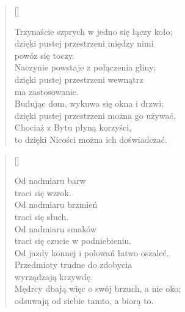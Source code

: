 \settowidth{\versewidth}{Trzynaście szprych w jedno się łączy koło;}
\begin{verse}[\versewidth]

  Trzynaście szprych w jedno się łączy koło; \\
  dzięki pustej przestrzeni między nimi \\
  powóz się toczy. \\
  Naczynie powstaje z połączenia gliny; \\
  dzięki pustej przestrzeni wewnątrz \\
  ma zastosowanie. \\
  Budując dom, wykuwa się okna i drzwi; \\
  dzięki pustej przestrzeni można go używać. \\
  Chociaż z Bytu płyną korzyści, \\
  to dzięki Nicości można ich doświadczać.
\end{verse}

\settowidth{\versewidth}{Od jazdy konnej i polowań łatwo oszaleć.}
\begin{verse}[\versewidth]

  Od nadmiaru barw \\
  traci się wzrok. \\
  Od nadmiaru brzmień \\
  traci się słuch. \\
  Od nadmiaru smaków \\
  traci się czucie w podniebieniu. \\
  Od jazdy konnej i polowań łatwo oszaleć. \\
  Przedmioty trudne do zdobycia \\
  wyrządzają krzywdę. \\
  Mędrcy dbają więc o swój brzuch, a nie oko; \\
  odsuwają od siebie tamto, a biorą to.
\end{verse}


